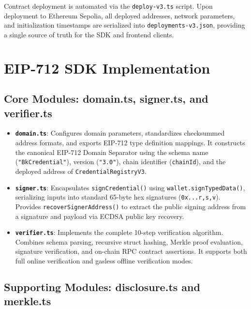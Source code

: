 Contract deployment is automated via the \texttt{deploy-v3.ts} script. Upon deployment to Ethereum Sepolia, all deployed addresses, network parameters, and initialization timestamps are serialized into \texttt{deployments-v3.json}, providing a single source of truth for the SDK and frontend clients.

\section{EIP-712 SDK Implementation}

\subsection{Core Modules: domain.ts, signer.ts, and verifier.ts}

\begin{itemize}
    \item \textbf{\texttt{domain.ts}}: Configures domain parameters, standardizes checksummed address formats, and exports EIP-712 type definition mappings. It constructs the canonical EIP-712 Domain Separator using the schema name (\texttt{"BkCredential"}), version (\texttt{"3.0"}), chain identifier (\texttt{chainId}), and the deployed address of \texttt{CredentialRegistryV3}.
    \item \textbf{\texttt{signer.ts}}: Encapsulates \texttt{signCredential()} using \texttt{wallet.signTypedData()}, serializing inputs into standard 65-byte hex signatures (\texttt{0x...r,s,v}). Provides \texttt{recoverSignerAddress()} to extract the public signing address from a signature and payload via ECDSA public key recovery.
    \item \textbf{\texttt{verifier.ts}}: Implements the complete 10-step verification algorithm. Combines schema parsing, recursive struct hashing, Merkle proof evaluation, signature verification, and on-chain RPC contract assertions. It supports both full online verification and gasless offline verification modes.
\end{itemize}

\subsection{Supporting Modules: disclosure.ts and merkle.ts}

